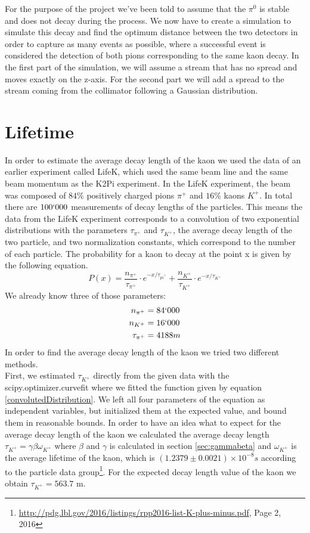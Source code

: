 \documentclass[a4paper,parskip,11pt, DIV12]{scrreprt}
\begin{document}
For the purpose of the project we've been told to assume that the $\pi^0$ is stable and does not decay during the process. We now have to create a simulation to simulate this decay and find the optimum distance between the two detectors in order to capture as many events as possible, where a successful event is considered the detection of both pions corresponding to the same kaon decay. In the first part of the simulation, we will assume a stream that has no spread and moves exactly on the z-axis. For the second part we will add a spread to the stream coming from the collimator following a Gaussian distribution.

\clearpage

\chapter{Lifetime}

In order to estimate the average decay length of the kaon we used the data of an earlier experiment called LifeK, which used the same beam line and the same beam momentum as the K2Pi experiment. In the LifeK experiment, the beam was composed of $84\%$ positively charged pions $\pi^+$ and $16\%$ kaons $K^+$. In total there are $100`000$ measurements of decay lengths of the particles. This means the data from the LifeK experiment corresponds to a convolution of two exponential distributions with the parameters $\tau_{\pi^+}$ and $\tau_{K^+}$, the average decay length of the two particle, and two normalization constants, which correspond to the number of each particle. The probability for a kaon to decay at the point x is given by the following equation.
\begin{equation}
\label{convolutedDistribution}
P(x)=  \frac{n_{\pi^+}}{\tau_{\pi^+}} \cdot e^{-x/ \tau_{pi^+}} + \frac{n_{K^+}}{\tau_{K^+}} \cdot e^{-x/ \tau_{K^+}}
\end{equation} 
We already know three of those parameters:
\begin{align*}
n_{\pi^+} &= 84`000 \\
n_{K^+} &= 16`000 \\
\tau_{\pi^+} &= 4188 m
\end{align*}
In order to find the average decay length of the kaon we tried two different methods.\\
First, we estimated $\tau_{K^+}$ directly from the given data with the scipy.optimizer.curvefit where we fitted the function given by equation \ref{convolutedDistribution}. We left all four parameters of the equation as independent variables, but initialized them at the expected value, and bound them in reasonable bounds. In order to have an idea what to expect for the average decay length of the kaon we calculated the average decay length $\tau_{K^+}= \gamma \beta \omega_{K^+}$ where $\beta$ and $\gamma$ is calculated in section \ref{sec:gammabeta} and $\omega_{K^+}$ is the average lifetime of the kaon, which is $(1.2379 \pm 0.0021) \times 10^{-8} s $ according to the particle data group\footnote{\url{http://pdg.lbl.gov/2016/listings/rpp2016-list-K-plus-minus.pdf}, Page 2, 2016}. For the expected decay length value of the kaon we obtain $\tau_{K^+} = 563.7$ m.
\end{document}
